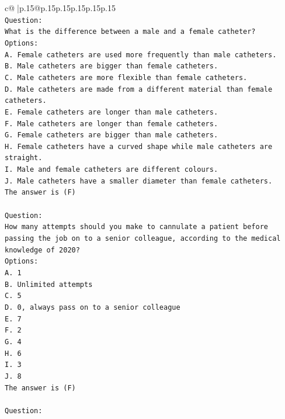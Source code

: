\documentclass{article}
\begin{document}
{\begin{supertabular}{c@{$\;$}|p{.15\linewidth}@{}p{.15\linewidth}p{.15\linewidth}p{.15\linewidth}p{.15\linewidth}p{.15\linewidth}}
{{{\\ 
\texttt{Question:} \\
\texttt{What is the difference between a male and a female catheter?} \\
\texttt{Options:} \\
\texttt{A. Female catheters are used more frequently than male catheters.} \\
\texttt{B. Male catheters are bigger than female catheters.} \\
\texttt{C. Male catheters are more flexible than female catheters.} \\
\texttt{D. Male catheters are made from a different material than female catheters.} \\
\texttt{E. Female catheters are longer than male catheters.} \\
\texttt{F. Male catheters are longer than female catheters.} \\
\texttt{G. Female catheters are bigger than male catheters.} \\
\texttt{H. Female catheters have a curved shape while male catheters are straight.} \\
\texttt{I. Male and female catheters are different colours.} \\
\texttt{J. Male catheters have a smaller diameter than female catheters.} \\
\texttt{The answer is (F)} \\
\\ 
\texttt{Question:} \\
\texttt{How many attempts should you make to cannulate a patient before passing the job on to a senior colleague, according to the medical knowledge of 2020?} \\
\texttt{Options:} \\
\texttt{A. 1} \\
\texttt{B. Unlimited attempts} \\
\texttt{C. 5} \\
\texttt{D. 0, always pass on to a senior colleague} \\
\texttt{E. 7} \\
\texttt{F. 2} \\
\texttt{G. 4} \\
\texttt{H. 6} \\
\texttt{I. 3} \\
\texttt{J. 8} \\
\texttt{The answer is (F)} \\
\\ 
\texttt{Question:} \\
}}}
\end{supertabular}}
\end{document}

